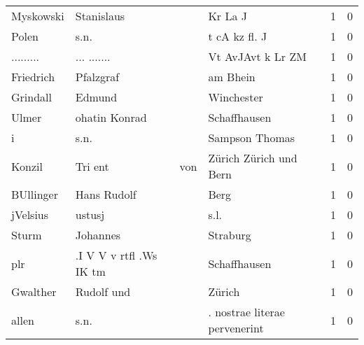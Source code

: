 \begin{tabular}{llllrr}
                Myskowski &                         Stanislaus &             &                                     Kr La J &          1 &         0 \\
                    Polen &                               s.n. &             &                               t cA kz fl. J &          1 &         0 \\
                ......... &                        ... ....... &             &                           Vt AvJAvt k Lr ZM &          1 &         0 \\
                Friedrich &                          Pfalzgraf &             &                                    am Bhein &          1 &         0 \\
                 Grindall &                             Edmund &             &                                  Winchester &          1 &         0 \\
                    Ulmer &                      ohatin Konrad &             &                                Schaffhausen &          1 &         0 \\
                        i &                               s.n. &             &                              Sampson Thomas &          1 &         0 \\
                   Konzil &                            Tri ent &         von &                      Zürich Zürich und Bern &          1 &         0 \\
                BUllinger &                        Hans Rudolf &             &                                        Berg &          1 &         0 \\
                 jVelsius &                             ustusj &             &                                        s.l. &          1 &         0 \\
                    Sturm &                           Johannes &             &                                    Straburg &          1 &         0 \\
                      plr &            .I V V v rtfl .Ws IK tm &             &                                Schaffhausen &          1 &         0 \\
                 Gwalther &                         Rudolf und &             &                                      Zürich &          1 &         0 \\
                    allen &                               s.n. &             &               . nostrae literae pervenerint &          1 &         0 \\

\end{tabular}
